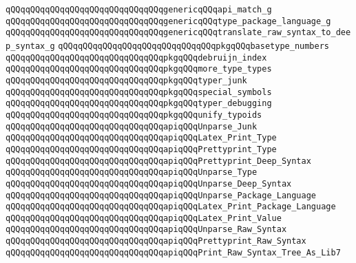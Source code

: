 \verb|qQQqqQQqqQQqqQQqqQQqqQQqqQQqqQQqgenericqQQqapi_match_g|\newline
\verb|qQQqqQQqqQQqqQQqqQQqqQQqqQQqqQQqgenericqQQqtype_package_language_g|\newline
\verb|qQQqqQQqqQQqqQQqqQQqqQQqqQQqqQQqgenericqQQqtranslate_raw_syntax_to_deep_syntax_g|\newline
\newline
\verb|qQQqqQQqqQQqqQQqqQQqqQQqqQQqqQQqpkgqQQqbasetype_numbers|\newline
\verb|qQQqqQQqqQQqqQQqqQQqqQQqqQQqqQQqpkgqQQqdebruijn_index|\newline
\verb|qQQqqQQqqQQqqQQqqQQqqQQqqQQqqQQqpkgqQQqmore_type_types|\newline
\verb|qQQqqQQqqQQqqQQqqQQqqQQqqQQqqQQqpkgqQQqtyper_junk|\newline
\verb|qQQqqQQqqQQqqQQqqQQqqQQqqQQqqQQqpkgqQQqspecial_symbols|\newline
\verb|qQQqqQQqqQQqqQQqqQQqqQQqqQQqqQQqpkgqQQqtyper_debugging|\newline
\verb|qQQqqQQqqQQqqQQqqQQqqQQqqQQqqQQqpkgqQQqunify_typoids|\newline
\newline
\verb|qQQqqQQqqQQqqQQqqQQqqQQqqQQqqQQqapiqQQqUnparse_Junk|\newline
\verb|qQQqqQQqqQQqqQQqqQQqqQQqqQQqqQQqapiqQQqLatex_Print_Type|\newline
\verb|qQQqqQQqqQQqqQQqqQQqqQQqqQQqqQQqapiqQQqPrettyprint_Type|\newline
\verb|qQQqqQQqqQQqqQQqqQQqqQQqqQQqqQQqapiqQQqPrettyprint_Deep_Syntax|\newline
\verb|qQQqqQQqqQQqqQQqqQQqqQQqqQQqqQQqapiqQQqUnparse_Type|\newline
\verb|qQQqqQQqqQQqqQQqqQQqqQQqqQQqqQQqapiqQQqUnparse_Deep_Syntax|\newline
\verb|qQQqqQQqqQQqqQQqqQQqqQQqqQQqqQQqapiqQQqUnparse_Package_Language|\newline
\verb|qQQqqQQqqQQqqQQqqQQqqQQqqQQqqQQqapiqQQqLatex_Print_Package_Language|\newline
\verb|qQQqqQQqqQQqqQQqqQQqqQQqqQQqqQQqapiqQQqLatex_Print_Value|\newline
\verb|qQQqqQQqqQQqqQQqqQQqqQQqqQQqqQQqapiqQQqUnparse_Raw_Syntax|\newline
\verb|qQQqqQQqqQQqqQQqqQQqqQQqqQQqqQQqapiqQQqPrettyprint_Raw_Syntax|\newline
\verb|qQQqqQQqqQQqqQQqqQQqqQQqqQQqqQQqapiqQQqPrint_Raw_Syntax_Tree_As_Lib7|\newline
